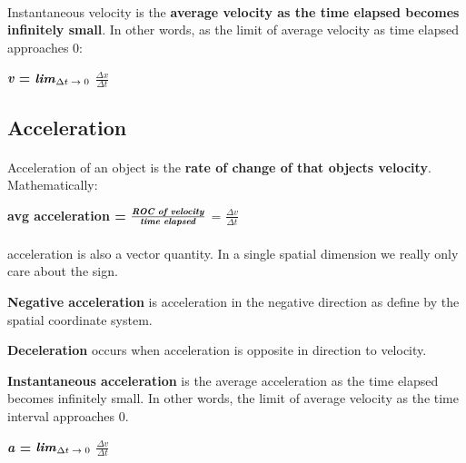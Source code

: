 \documentclass[12pt, a4paper]{article}
\begin{document}
\paragraph*{}
Instantaneous velocity is the \textbf{average velocity as the time elapsed becomes infinitely small}.
In other words, as the limit of average velocity as time elapsed approaches 0:

{
    \centering
    \textbf{\textit{v} = } $\textrm{\textbf{\textit{lim}}}_{\textrm{$\Delta t \rightarrow 0$}}$ 
    \textbf{${\frac{\textrm{$\Delta x$}}{\textrm{$\Delta t$}}}$}

}

\subsection{Acceleration}
\paragraph*{}
Acceleration of an object is the \textbf{rate of change of that objects velocity}. Mathematically:

{
    \centering
    \textbf{avg acceleration =} $\frac{\textbf{\textit{ROC of velocity}}}{\textrm{\textbf{\textit{time elapsed}}}}$ = 
    \textbf{${\frac{\textrm{$\Delta v$}}{\textrm{$\Delta t$}}}$}

} 

\paragraph*{}
acceleration is also a vector quantity. In a single spatial dimension we really only care about
the sign. 

\textbf{Negative acceleration} is acceleration in the negative direction as define by the spatial coordinate system.

\textbf{Deceleration} occurs when acceleration is opposite in direction to velocity.

\textbf{Instantaneous acceleration} is the average acceleration as the time elapsed becomes infinitely small.
In other words, the limit of average velocity as the time interval approaches 0. 

{
    \centering
    \textbf{\textit{a } = } $\textrm{\textbf{\textit{lim}}}_{\textrm{$\Delta t \rightarrow 0$}}$ 
    \textbf{${\frac{\textrm{$\Delta v$}}{\textrm{$\Delta t$}}}$}

}
\end{document}
